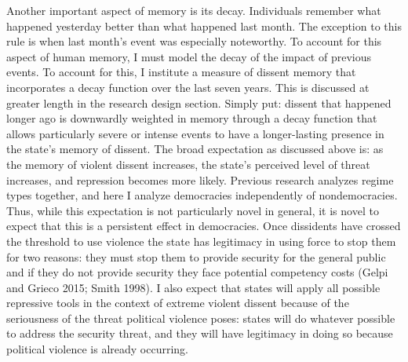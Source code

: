 \documentclass[ignorenonframetext,]{beamer}
\begin{document}
\begin{frame}[fragile]
Another important aspect of memory is its decay. Individuals remember
what happened yesterday better than what happened last month. The
exception to this rule is when last month's event was especially
noteworthy. To account for this aspect of human memory, I must model the
decay of the impact of previous events. To account for this, I institute
a measure of dissent memory that incorporates a decay function over the
last seven years. This is discussed at greater length in the research
design section. Simply put: dissent that happened longer ago is
downwardly weighted in memory through a decay function that allows
particularly severe or intense events to have a longer-lasting presence
in the state's memory of dissent. The broad expectation as discussed
above is: as the memory of violent dissent increases, the state's
perceived level of threat increases, and repression becomes more likely.
Previous research analyzes regime types together, and here I analyze
democracies independently of nondemocracies. Thus, while this
expectation is not particularly novel in general, it is novel to expect
that this is a persistent effect in democracies. Once dissidents have
crossed the threshold to use violence the state has legitimacy in using
force to stop them for two reasons: they must stop them to provide
security for the general public and if they do not provide security they
face potential competency costs (Gelpi and Grieco 2015; Smith 1998). I
also expect that states will apply all possible repressive tools in the
context of extreme violent dissent because of the seriousness of the
threat political violence poses: states will do whatever possible to
address the security threat, and they will have legitimacy in doing so
because political violence is already occurring.


\end{frame}
\end{document}
